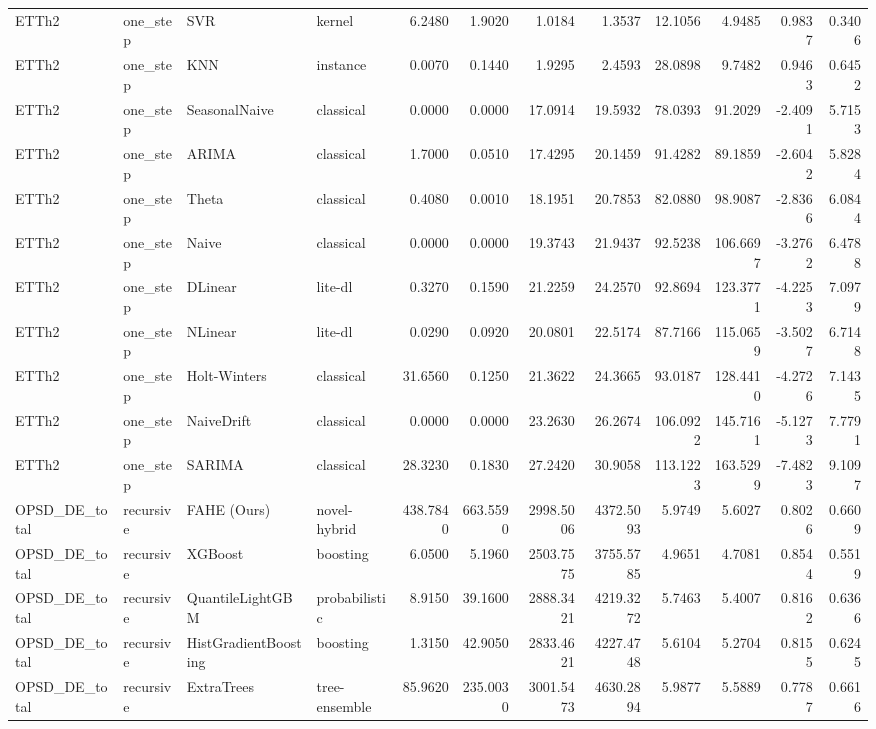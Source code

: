\begin{tabular}{llllrrrrrrrr}
ETTh2 & one_step & SVR & kernel & 6.2480 & 1.9020 & 1.0184 & 1.3537 & 12.1056 & 4.9485 & 0.9837 & 0.3406 \\
ETTh2 & one_step & KNN & instance & 0.0070 & 0.1440 & 1.9295 & 2.4593 & 28.0898 & 9.7482 & 0.9463 & 0.6452 \\
ETTh2 & one_step & SeasonalNaive & classical & 0.0000 & 0.0000 & 17.0914 & 19.5932 & 78.0393 & 91.2029 & -2.4091 & 5.7153 \\
ETTh2 & one_step & ARIMA & classical & 1.7000 & 0.0510 & 17.4295 & 20.1459 & 91.4282 & 89.1859 & -2.6042 & 5.8284 \\
ETTh2 & one_step & Theta & classical & 0.4080 & 0.0010 & 18.1951 & 20.7853 & 82.0880 & 98.9087 & -2.8366 & 6.0844 \\
ETTh2 & one_step & Naive & classical & 0.0000 & 0.0000 & 19.3743 & 21.9437 & 92.5238 & 106.6697 & -3.2762 & 6.4788 \\
ETTh2 & one_step & DLinear & lite-dl & 0.3270 & 0.1590 & 21.2259 & 24.2570 & 92.8694 & 123.3771 & -4.2253 & 7.0979 \\
ETTh2 & one_step & NLinear & lite-dl & 0.0290 & 0.0920 & 20.0801 & 22.5174 & 87.7166 & 115.0659 & -3.5027 & 6.7148 \\
ETTh2 & one_step & Holt-Winters & classical & 31.6560 & 0.1250 & 21.3622 & 24.3665 & 93.0187 & 128.4410 & -4.2726 & 7.1435 \\
ETTh2 & one_step & NaiveDrift & classical & 0.0000 & 0.0000 & 23.2630 & 26.2674 & 106.0922 & 145.7161 & -5.1273 & 7.7791 \\
ETTh2 & one_step & SARIMA & classical & 28.3230 & 0.1830 & 27.2420 & 30.9058 & 113.1223 & 163.5299 & -7.4823 & 9.1097 \\
OPSD_DE_total & recursive & FAHE (Ours) & novel-hybrid & 438.7840 & 663.5590 & 2998.5006 & 4372.5093 & 5.9749 & 5.6027 & 0.8026 & 0.6609 \\
OPSD_DE_total & recursive & XGBoost & boosting & 6.0500 & 5.1960 & 2503.7575 & 3755.5785 & 4.9651 & 4.7081 & 0.8544 & 0.5519 \\
OPSD_DE_total & recursive & QuantileLightGBM & probabilistic & 8.9150 & 39.1600 & 2888.3421 & 4219.3272 & 5.7463 & 5.4007 & 0.8162 & 0.6366 \\
OPSD_DE_total & recursive & HistGradientBoosting & boosting & 1.3150 & 42.9050 & 2833.4621 & 4227.4748 & 5.6104 & 5.2704 & 0.8155 & 0.6245 \\
OPSD_DE_total & recursive & ExtraTrees & tree-ensemble & 85.9620 & 235.0030 & 3001.5473 & 4630.2894 & 5.9877 & 5.5889 & 0.7787 & 0.6616 \\

\end{tabular}
